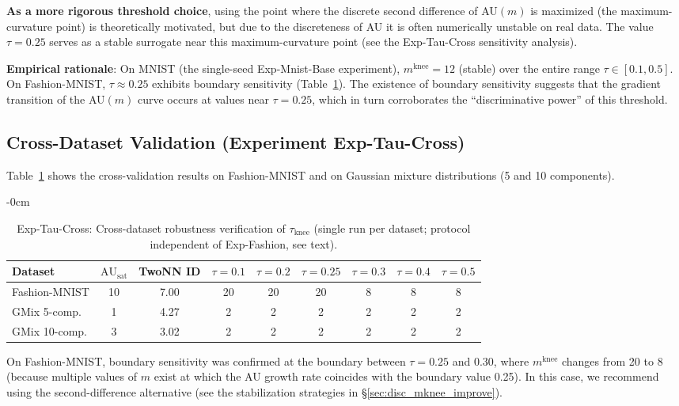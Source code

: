 \documentclass[make,article,submit,pdftex,moreauthors]{Definitions/mdpi}
\newcommand{\AUsat}{\mathrm{AU}_{\mathrm{sat}}}
\newcommand{\mknee}{m^{\mathrm{knee}}}
\begin{document}
\textbf{As a more rigorous threshold choice}, using the point where the discrete
second difference of AU$(m)$ is maximized (the maximum-curvature point) is
theoretically motivated, but due to the discreteness of AU it is often
numerically unstable on real data.
The value $\tau = 0.25$ serves as a stable surrogate near this maximum-curvature
point (see the Exp-Tau-Cross sensitivity analysis).

\textbf{Empirical rationale}:
On MNIST (the single-seed Exp-Mnist-Base experiment), $\mknee = 12$ (stable) over
the entire range $\tau \in [0.1, 0.5]$.
On Fashion-MNIST, $\tau \approx 0.25$ exhibits boundary sensitivity
(Table~\ref{tab:ez}).
The existence of boundary sensitivity suggests that the gradient transition of
the AU$(m)$ curve occurs at values near $\tau = 0.25$, which in turn corroborates
the ``discriminative power'' of this threshold.

\subsection*{Cross-Dataset Validation (Experiment Exp-Tau-Cross)}

Table~\ref{tab:ez} shows the cross-validation results on Fashion-MNIST and on
Gaussian mixture distributions (5 and 10 components).

\begin{table}[H]
\begin{adjustwidth}{-\extralength}{0cm}
\centering
\caption{Exp-Tau-Cross: Cross-dataset robustness verification of $\tau_{\mathrm{knee}}$ (single run per dataset; protocol independent of Exp-Fashion, see text).}
\label{tab:ez}
\small
\begin{tabular}{lcc|cccccc}
\toprule
Dataset & $\AUsat$ & TwoNN ID & $\tau=0.1$ & $\tau=0.2$ & $\tau=0.25$ & $\tau=0.3$ & $\tau=0.4$ & $\tau=0.5$ \\
\midrule
Fashion-MNIST & 10 & 7.00 & 20 & 20 & 20 & 8 & 8 & 8 \\
GMix 5-comp. & 1 & 4.27 & 2 & 2 & 2 & 2 & 2 & 2 \\
GMix 10-comp. & 3 & 3.02 & 2 & 2 & 2 & 2 & 2 & 2 \\
\bottomrule
\end{tabular}
\end{adjustwidth}
\end{table}

On Fashion-MNIST, boundary sensitivity was confirmed at the boundary between
$\tau = 0.25$ and $0.30$, where $\mknee$ changes from 20 to 8
(because multiple values of $m$ exist at which the AU growth rate coincides with
the boundary value 0.25).
In this case, we recommend using the second-difference alternative
(see the stabilization strategies in \S\ref{sec:disc_mknee_improve}).
\end{document}
